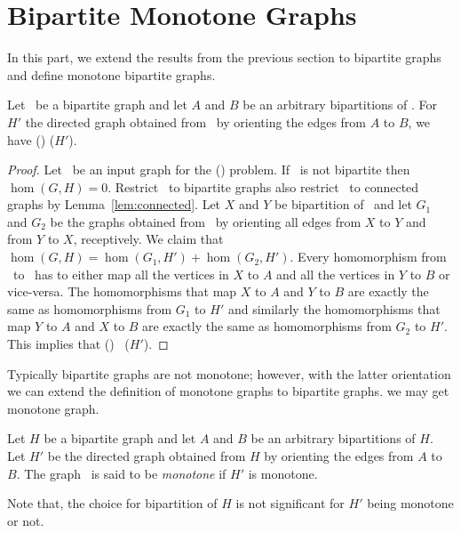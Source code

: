 \section{Bipartite Monotone Graphs}
In this part, we extend the results from the previous section to bipartite
graphs and define monotone bipartite graphs.

\begin{theorem}  \label{thrm:bior}
Let \mH\ be a bipartite graph and let \(A\) and \(B\) be an arbitrary
bipartitions of \mH\@. For \(H'\) the directed graph obtained from
\mH\ by orienting the edges from \(A\) to \(B\), we have \chom(\mH) \maple \chom(\(H'\)).
\end{theorem}

\begin{proof}
Let \mG\ be an input graph for the \chom(\mH) problem. If \mG\ is not bipartite then 
\(\hom(G,H)=0\). Restrict \mG\ to bipartite graphs also restrict \mG\ to connected graphs
by Lemma~\ref{lem:connected}\@. Let \(X\) and \(Y\) be bipartition of \mG\ and let \(G_1\) 
and \(G_2\) be the graphs obtained from \mG\ by orienting all edges from \(X\) to \(Y\) and
from \(Y\) to \(X\), receptively. We claim that \(\hom(G,H) = \hom(G_1, H') + \hom(G_2, H')\).
Every homomorphism from \mG\ to \mH\ has to either map all the vertices in
\(X\) to \(A\) and all the vertices in \(Y\) to \(B\) or vice-versa. The homomorphisms that
map \(X\) to \(A\) and \(Y\) to \(B\) are exactly the same as homomorphisms from \(G_1\) to
\(H'\) and similarly the homomorphisms that map \(Y\) to \(A\) and \(X\) to \(B\)
are exactly the same as homomorphisms from \(G_2\) to \(H'\)\@. This implies that
\chom(\mH) \maple\ \chom(\(H'\))\@.
\end{proof}

Typically bipartite graphs are not monotone; however, with the latter orientation
we can extend the definition of monotone graphs to bipartite graphs.
we may get monotone graph.

\begin{defi} 
Let \(H\) be a bipartite graph and let \(A\) and \(B\) be an arbitrary
bipartitions of \(H\). Let \(H'\) be the directed graph obtained from
\(H\) by orienting the edges from \(A\) to \(B\)\@. The graph \mH\ is said to be
\emph{monotone} if \(H'\) is monotone.
\end{defi}

Note that, the choice for bipartition of \(H\) is not significant for
\(H'\) being monotone or not.

